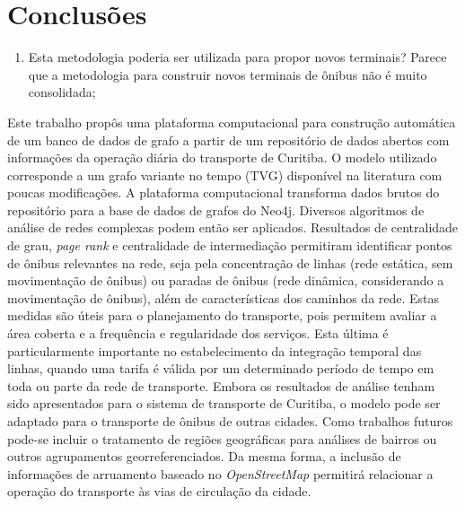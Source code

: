 
\chapter{Conclusões}
\label{cap:conclusoeseperspectivas}


\begin{enumerate}
    \item Esta metodologia poderia ser utilizada para propor novos terminais? Parece que a metodologia para construir novos terminais de ônibus não é muito consolidada;
\end{enumerate}

Este trabalho propôs uma plataforma computacional para construção automática de um banco de dados de grafo a partir de um repositório de dados abertos com informações da operação diária do transporte de Curitiba. O modelo utilizado corresponde a um grafo variante no tempo (TVG) disponível na literatura com poucas modificações. A plataforma computacional transforma dados brutos do repositório para a base de dados de grafos do Neo4j. Diversos algoritmos de análise de redes complexas podem então ser aplicados. Resultados de centralidade de grau, \emph{page rank} e centralidade de intermediação permitiram identificar pontos de ônibus relevantes na rede, seja pela concentração de linhas (rede estática, sem movimentação de ônibus) ou paradas de ônibus (rede dinâmica, considerando a movimentação de ônibus), além de características dos caminhos da rede. Estas medidas são úteis para o planejamento do transporte, pois permitem avaliar a área coberta e a frequência e regularidade dos serviços. Esta última é particularmente importante no estabelecimento da integração temporal das linhas, quando uma tarifa é válida por um determinado período de tempo em toda ou parte da rede de transporte. Embora os resultados de análise tenham sido apresentados para o sistema de transporte de Curitiba, o modelo pode ser adaptado para o transporte de ônibus de outras cidades. Como trabalhos futuros pode-se incluir o tratamento de regiões geográficas para análises de bairros ou outros agrupamentos georreferenciados. Da mesma forma, a inclusão de informações de arruamento baseado no \emph{OpenStreetMap} permitirá relacionar a operação do transporte às vias de circulação da cidade.
